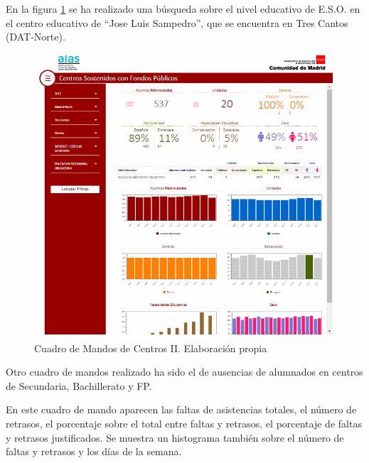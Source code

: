 En la figura \ref{fig:CentrosResumenII} se ha realizado una búsqueda sobre el nivel educativo de E.S.O. en el centro educativo de ``Jose Luis Sampedro'', que se encuentra en Tres Cantos (DAT-Norte).
\begin{figure}[htb]
	\centering
	\caption{Cuadro de Mandos de Centros II. Elaboración propia}
	\label{fig:CentrosResumenII}
	\includegraphics[width=1\textwidth]{recursos/CentrosResumenII}
\end{figure}
\FloatBarrier

Otro cuadro de mandos realizado ha sido el de ausencias de alumnados en centros de Secundaria, Bachillerato y FP.

En este cuadro de mando aparecen las faltas de asistencias totales, el número de retrasos, el porcentaje sobre el total entre faltas y retrasos, el porcentaje de faltas y retrasos justificados. Se muestra un histograma también sobre el número de faltas y retrasos y los días de la semana.

